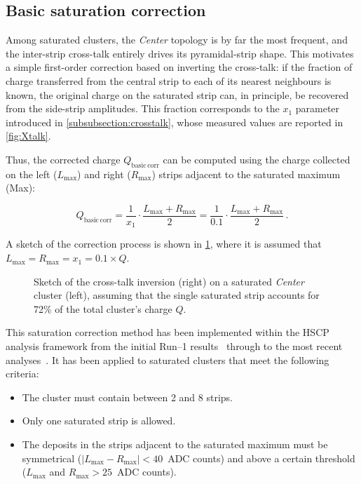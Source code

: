 \subsection{Basic saturation correction}
\label{subsec:basiccorr}

Among saturated clusters, the \textit{Center} topology is by far the most frequent, and the inter-strip cross-talk entirely drives its pyramidal-strip shape. This motivates a simple first-order correction based on inverting the cross-talk: if the fraction of charge transferred from the central strip to each of its nearest neighbours is known, the original charge on the saturated strip can, in principle, be recovered from the side-strip amplitudes. This fraction corresponds to the $x_1$ parameter introduced in \cref{subsubsection:crosstalk}, whose measured values are reported in \cref{fig:Xtalk}.

Thus, the corrected charge $Q_\mathrm{basic\,corr}$ can be computed using the charge collected on the left ($L_\mathrm{max}$) and right ($R_\mathrm{max}$) strips adjacent to the saturated maximum (Max):

\begin{equation}
    Q_\mathrm{basic\,corr} = \frac{1}{x_1} \cdot \frac{L_\mathrm{max}+R_\mathrm{max}}{2} = \frac{1}{0.1} \cdot \frac{L_\mathrm{max}+R_\mathrm{max}}{2} \, .
    \label{eq:xtalkinversion}
\end{equation}

A sketch of the correction process is shown in \cref{fig:XtalkInversion}, where it is assumed that $L_\mathrm{max}=R_\mathrm{max}=x_1=0.1\times Q$.

\begin{figure}[h]
    \centering
    
    \caption{Sketch of the cross-talk inversion (right) on a saturated \textit{Center} cluster (left), assuming that the single saturated strip accounts for 72\% of the total cluster's charge $Q$.}
    \label{fig:XtalkInversion}
\end{figure}

This saturation correction method has been implemented within the HSCP analysis framework from the initial Run--1 results~\cite{CMS_HSCP_7TeV} through to the most recent analyses~\cite{HSCP_Run2}. It has been applied to saturated clusters that meet the following criteria:

\begin{itemize}
    \item The cluster must contain between 2 and 8 strips.
    \item Only one saturated strip is allowed.
    \item The deposits in the strips adjacent to the saturated maximum must be symmetrical ($|L_{\mathrm{max}}-R_{\mathrm{max}}|<40$~ADC counts) and above a certain threshold ($L_{\mathrm{max}}$ and $R_{\mathrm{max}}>25$~ADC counts). 
\end{itemize}

